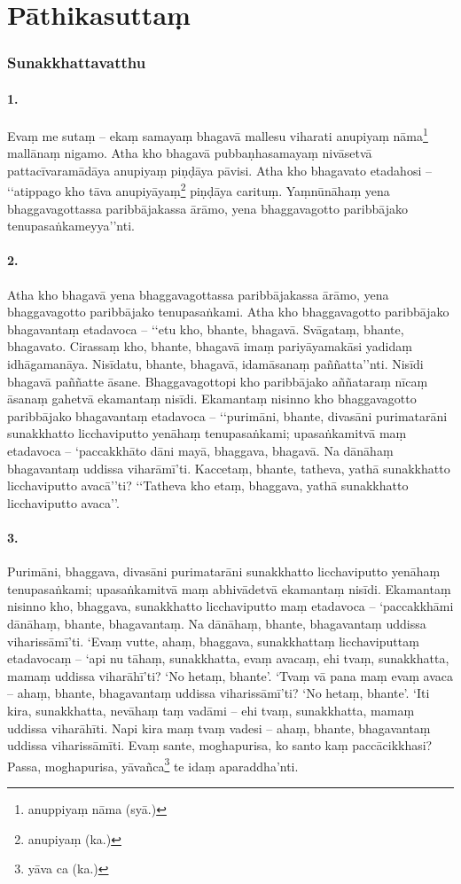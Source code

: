 
\section{Pāthikasuttaṃ}

\subsubsection{Sunakkhattavatthu}

\paragraph{1.} Evaṃ me sutaṃ – ekaṃ samayaṃ bhagavā mallesu viharati anupiyaṃ nāma\footnote{anuppiyaṃ nāma (syā.)} mallānaṃ nigamo. Atha kho bhagavā pubbaṇhasamayaṃ nivāsetvā pattacīvaramādāya anupiyaṃ piṇḍāya pāvisi. Atha kho bhagavato etadahosi – ‘‘atippago kho tāva anupiyāyaṃ\footnote{anupiyaṃ (ka.)} piṇḍāya carituṃ. Yaṃnūnāhaṃ yena bhaggavagottassa paribbājakassa ārāmo, yena bhaggavagotto paribbājako tenupasaṅkameyya’’nti.

\paragraph{2.} Atha kho bhagavā yena bhaggavagottassa paribbājakassa ārāmo, yena bhaggavagotto paribbājako tenupasaṅkami. Atha kho bhaggavagotto paribbājako bhagavantaṃ etadavoca – ‘‘etu kho, bhante, bhagavā. Svāgataṃ, bhante, bhagavato. Cirassaṃ kho, bhante, bhagavā imaṃ pariyāyamakāsi yadidaṃ idhāgamanāya. Nisīdatu, bhante, bhagavā, idamāsanaṃ paññatta’’nti. Nisīdi bhagavā paññatte āsane. Bhaggavagottopi kho paribbājako aññataraṃ nīcaṃ āsanaṃ gahetvā ekamantaṃ nisīdi. Ekamantaṃ nisinno kho bhaggavagotto paribbājako bhagavantaṃ etadavoca – ‘‘purimāni, bhante, divasāni purimatarāni sunakkhatto licchaviputto yenāhaṃ tenupasaṅkami; upasaṅkamitvā maṃ etadavoca – ‘paccakkhāto dāni mayā, bhaggava, bhagavā. Na dānāhaṃ bhagavantaṃ uddissa viharāmī’ti. Kaccetaṃ, bhante, tatheva, yathā sunakkhatto licchaviputto avacā’’ti? ‘‘Tatheva kho etaṃ, bhaggava, yathā sunakkhatto licchaviputto avaca’’.

\paragraph{3.} Purimāni, bhaggava, divasāni purimatarāni sunakkhatto licchaviputto yenāhaṃ tenupasaṅkami; upasaṅkamitvā maṃ abhivādetvā ekamantaṃ nisīdi. Ekamantaṃ nisinno kho, bhaggava, sunakkhatto licchaviputto maṃ etadavoca – ‘paccakkhāmi dānāhaṃ, bhante, bhagavantaṃ. Na dānāhaṃ, bhante, bhagavantaṃ uddissa viharissāmī’ti. ‘Evaṃ vutte, ahaṃ, bhaggava, sunakkhattaṃ licchaviputtaṃ etadavocaṃ – ‘api nu tāhaṃ, sunakkhatta, evaṃ avacaṃ, ehi tvaṃ, sunakkhatta, mamaṃ uddissa viharāhī’ti? ‘No hetaṃ, bhante’. ‘Tvaṃ vā pana maṃ evaṃ avaca – ahaṃ, bhante, bhagavantaṃ uddissa viharissāmī’ti? ‘No hetaṃ, bhante’. ‘Iti kira, sunakkhatta, nevāhaṃ taṃ vadāmi – ehi tvaṃ, sunakkhatta, mamaṃ uddissa viharāhīti. Napi kira maṃ tvaṃ vadesi – ahaṃ, bhante, bhagavantaṃ uddissa viharissāmīti. Evaṃ sante, moghapurisa, ko santo kaṃ paccācikkhasi? Passa, moghapurisa, yāvañca\footnote{yāva ca (ka.)} te idaṃ aparaddha’nti.

